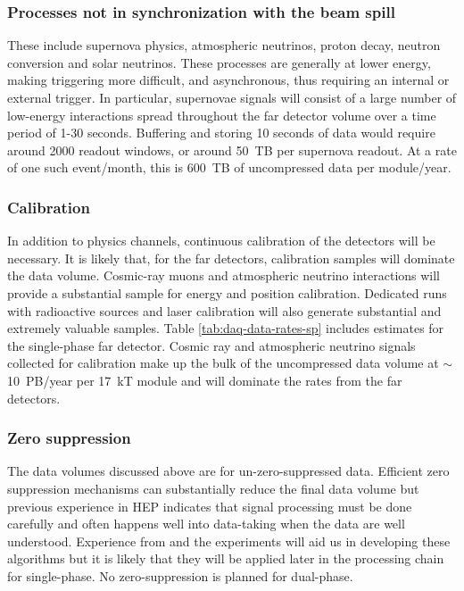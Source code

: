 \subsubsection{Processes not in synchronization with the beam spill} These include supernova physics, atmospheric neutrinos, proton decay, neutron conversion and solar neutrinos.  These processes are generally at lower energy, making triggering more difficult, and asynchronous, thus requiring an internal or external trigger.  In particular, supernovae signals will consist of a large number of low-energy interactions spread throughout the far detector volume over a time period of 1-30 seconds. Buffering and storing 10 seconds of data would require around 2000 readout windows, or around 50~TB per supernova readout.  At a rate of one such event/month, this is 600~TB of uncompressed data per module/year.

\subsubsection{
Calibration}
In addition to physics channels, continuous calibration of the detectors will be necessary.  It is likely that, for the far detectors, calibration samples will  dominate the data volume. Cosmic-ray muons and atmospheric neutrino interactions will provide a substantial sample for energy and position calibration.  Dedicated runs with radioactive sources and laser calibration will also generate substantial and extremely valuable samples. Table \ref{tab:daq-data-rates-sp} includes estimates for the single-phase far detector.   Cosmic ray and atmospheric neutrino signals collected for calibration make up the bulk of the uncompressed  data volume at $\sim$ 10~PB/year per 17~kT module and will dominate the rates from the far detectors.  













\subsubsection{Zero suppression}

The data volumes discussed above are for un-zero-suppressed data.  Efficient zero suppression mechanisms can substantially reduce the final data volume but previous experience in HEP indicates that signal processing must be done carefully and often happens well into data-taking when the data are well understood.  Experience from   and the  experiments will aid us in developing these algorithms but it is likely that they will be applied later in the processing chain for single-phase.  No zero-suppression is planned for dual-phase.

